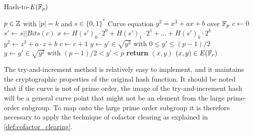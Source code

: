 \begin{algorithm}\label{alg:hash-to-e}\caption{Hash-to-$E(\mathbb{F}_p)$}
\begin{algorithmic}[0]
\Require $p \in \mathbb{Z}$ with $|p|=k$ and $s\in\{0,1\}^*$
\Require Curve equation $y^2 = x^3 + ax +b$ over $\mathbb{F}_p$
\State $c \gets 0$	
\Repeat
\State $s' \gets s||Bits(c)$
\State $x \gets H(s')_0\cdot 2^0 + H(s')_1\cdot 2^1 + \ldots + H(s')_{k}\cdot 2^{k}$ 
\State $y^2 \gets z^3 + a\cdot z + b$ 
\State $c\gets c+1$
 
 
\State $y \gets y'\in \sqrt{y^2}$ with $0\leq y' \leq (p-1)/2$
\Else 
\State $y \gets y'\in \sqrt{y^2}$ with $(p-1)/2 < y' < p$
\EndIf
\State \textbf{return} $(x,y)$
\EndProcedure
\Ensure $(x,y)\in E(\mathbb{F}_r)$
\end{algorithmic}
\end{algorithm}

The try-and-increment method is relatively easy to implement, and it maintains the cryptographic properties of the original hash function. It should be noted that if the curve is not of prime order, the image of the try-and-increment hash will be a general curve point that might not be an element from the large prime-order subgroup. To map onto the large prime order subgroup it is therefore necessary to apply the technique of cofactor clearing as explained in \ref{def:cofactor_clearing}.

